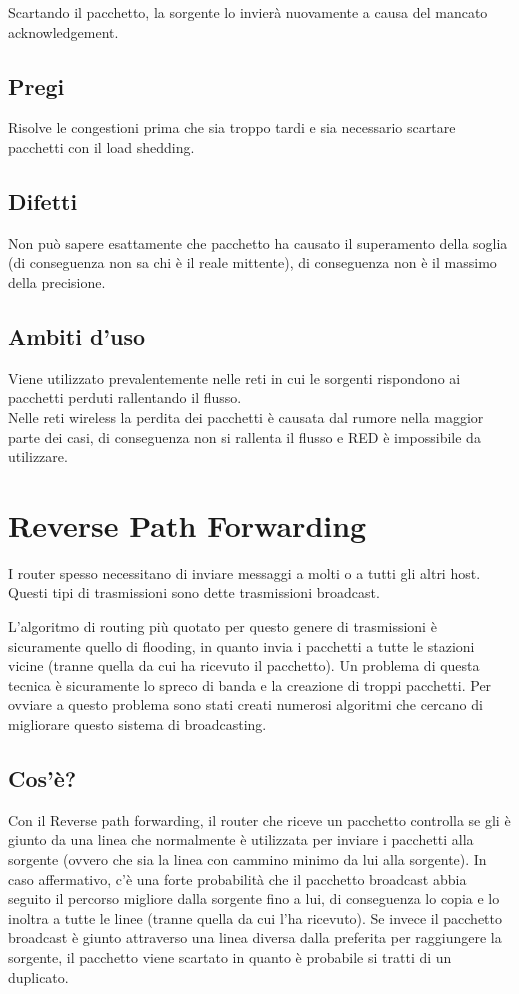 Scartando il pacchetto, la sorgente lo invierà nuovamente a causa del mancato acknowledgement.

\subsection{Pregi}
Risolve le congestioni prima che sia troppo tardi e sia necessario scartare pacchetti con il load shedding.

\subsection{Difetti}
Non può sapere esattamente che pacchetto ha causato il superamento della soglia (di conseguenza non sa chi è il reale mittente), di conseguenza non è il massimo della precisione.

\subsection{Ambiti d'uso}
Viene utilizzato prevalentemente nelle reti in cui le sorgenti rispondono ai pacchetti perduti rallentando il flusso.\\
Nelle reti wireless la perdita dei pacchetti è causata dal rumore nella maggior parte dei casi, di conseguenza non si rallenta il flusso e RED è impossibile da utilizzare.

\section{Reverse Path Forwarding}

I router spesso necessitano di inviare messaggi a molti o a tutti gli altri host. Questi tipi di trasmissioni sono dette trasmissioni broadcast.

L'algoritmo di routing più quotato per questo genere di trasmissioni è sicuramente quello di flooding, in quanto invia i pacchetti a tutte le stazioni vicine (tranne quella da cui ha ricevuto il pacchetto). Un problema di questa tecnica è sicuramente lo spreco di banda e la creazione di troppi pacchetti.
Per ovviare a questo problema sono stati creati numerosi algoritmi che cercano di migliorare questo sistema di broadcasting.

\subsection{Cos'è?}
Con il Reverse path forwarding, il router che riceve un pacchetto controlla se gli è giunto da una linea che normalmente è utilizzata per inviare i pacchetti alla sorgente (ovvero che sia la linea con cammino minimo da lui alla sorgente). In caso affermativo, c'è una forte probabilità che il pacchetto broadcast abbia seguito il percorso migliore dalla sorgente fino a lui, di conseguenza lo copia e lo inoltra a tutte le linee (tranne quella da cui l'ha ricevuto). Se invece il pacchetto broadcast è giunto attraverso una linea diversa dalla preferita per raggiungere la sorgente, il pacchetto viene scartato in quanto è probabile si tratti di un duplicato.



